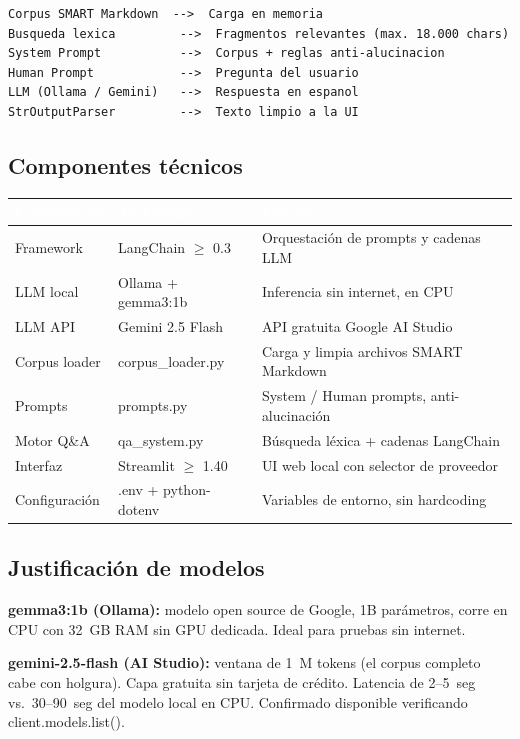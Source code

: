 \documentclass[12pt, a4paper]{article}
\newcommand{\THead}[1]{\cellcolor{hbg}\textcolor{white}{\sffamily\bfseries\small #1}}
\newcommand{\TA}{\rowcolor{g4}}
\newcommand{\tc}[1]{{\footnotesize\ttfamily #1}}
\begin{document}
\begin{lstlisting}
Corpus SMART Markdown  -->  Carga en memoria
Busqueda lexica         -->  Fragmentos relevantes (max. 18.000 chars)
System Prompt           -->  Corpus + reglas anti-alucinacion
Human Prompt            -->  Pregunta del usuario
LLM (Ollama / Gemini)   -->  Respuesta en espanol
StrOutputParser         -->  Texto limpio a la UI
\end{lstlisting}

\subsection{Componentes técnicos}

\begin{tabularx}{\linewidth}{F{3.2cm} F{4.0cm} L}
\toprule
\THead{Componente} & \THead{Tecnología} & \THead{Función} \\
\midrule
Framework         & LangChain $\geq$ 0.3      & Orquestación de prompts y cadenas LLM \\
\TA LLM local     & Ollama + gemma3:1b        & Inferencia sin internet, en CPU \\
LLM API           & Gemini 2.5 Flash          & API gratuita Google AI Studio \\
\TA Corpus loader & \tc{corpus\_loader.py}    & Carga y limpia archivos SMART Markdown \\
Prompts           & \tc{prompts.py}           & System / Human prompts, anti-alucinación \\
\TA Motor Q\&A    & \tc{qa\_system.py}        & Búsqueda léxica + cadenas LangChain \\
Interfaz          & Streamlit $\geq$ 1.40     & UI web local con selector de proveedor \\
\TA Configuración & \tc{.env} + python-dotenv & Variables de entorno, sin hardcoding \\
\bottomrule
\end{tabularx}

\vspace{6pt}

\subsection{Justificación de modelos}

\textbf{gemma3:1b (Ollama):} modelo open source de Google, 1B parámetros, corre en CPU
con 32~GB RAM sin GPU dedicada. Ideal para pruebas sin internet.

\textbf{gemini-2.5-flash (AI Studio):} ventana de 1~M tokens (el corpus completo cabe
con holgura). Capa gratuita sin tarjeta de crédito. Latencia de 2--5~seg vs.\ 30--90~seg
del modelo local en CPU. Confirmado disponible verificando \tc{client.models.list()}.
\end{document}
